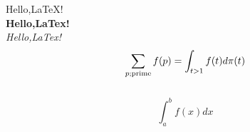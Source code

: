 \documentclass[24pt,a4paper,twocolumn]{article}
\begin{document}
\columnsep{300pt}
\setcounter{page}{10}
Hello,\LaTeX!{\\}
\textbf{Hello,LaTex!}{\\}
\emph{Hello,LaTex!}{\\}
\[\sum_{p\rm;prime}f(p) = \int_{t>1}f(t)d\pi(t)\]\\

\[\int_a^b f(x)dx\]
\end{document}

